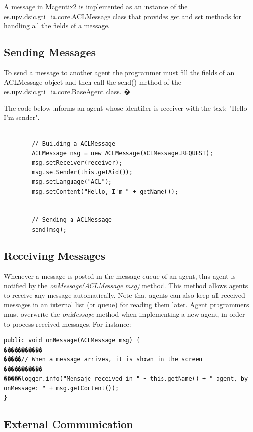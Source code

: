 A message in Magentix2 is implemented as an instance of the \url{es.upv.dsic.gti_ia.core.ACLMessage} class that provides get and set methods for handling all the fields of a message.

\subsection{Sending Messages}

To send a message to another agent the programmer must fill the fields of an ACLMessage object and then call the send() method of the \url{es.upv.dsic.gti_ia.core.BaseAgent} class.
�

The code below informs an agent whose identifier is receiver with the text: "Hello I'm sender".
\begin{lstlisting}[style=Java]

		// Building a ACLMessage
		ACLMessage msg = new ACLMessage(ACLMessage.REQUEST);
		msg.setReceiver(receiver);
		msg.setSender(this.getAid());
		msg.setLanguage("ACL");
		msg.setContent("Hello, I'm " + getName());


		// Sending a ACLMessage
		send(msg);

\end{lstlisting}

\subsection{Receiving Messages}

Whenever a message is posted in the message queue of an agent, this agent is notified by the \textit{onMessage(ACLMessage msg)} method. This method allows agents to receive any message automatically. Note that agents can also keep all received messages in an internal list (or queue) for reading them later.
Agent programmers must overwrite the  \textit{onMessage} method when  implementing a new agent, in order to process received messages. For instance:

\begin{lstlisting}[style=Java]
public void onMessage(ACLMessage msg) {
�����������
�����// When a message arrives, it is shown in the screen
�����������
�����logger.info("Mensaje received in " + this.getName() + " agent, by onMessage: " + msg.getContent());
}
\end{lstlisting}
\subsection{External Communication}

